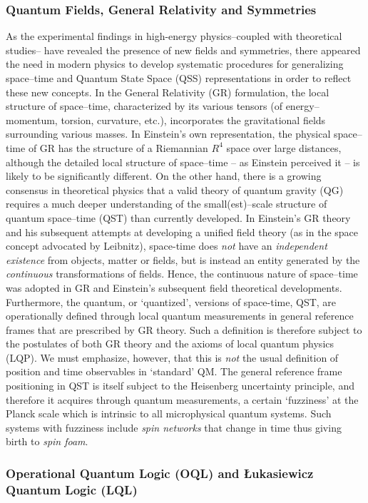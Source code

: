 \documentclass[12pt]{article}
\theoremstyle{plain}
\theoremstyle{definition}
\theoremstyle{plain}
\numberwithin{equation}{section}
\begin{document}
\subsubsection{Quantum Fields, General Relativity and Symmetries}
 As the experimental findings in high-energy physics--coupled
with theoretical studies-- have revealed the presence of new fields
and symmetries, there appeared the need in modern physics to develop
systematic procedures for generalizing space--time and Quantum State
Space (QSS) representations in order to reflect these new
concepts. In the General Relativity (GR) formulation, the local structure of
space--time, characterized by its various tensors (of
energy--momentum, torsion, curvature, etc.), incorporates the
gravitational fields surrounding various masses. In Einstein's own
representation, the physical space--time of GR has the structure
of a Riemannian $R^4$ space over large distances, although the
detailed local structure of space--time -- as Einstein perceived
it -- is likely to be significantly different. On the other hand, 
there is a growing consensus in theoretical physics that a valid 
theory of quantum gravity (QG) requires a much
deeper understanding of the small(est)--scale structure of quantum
space--time (QST) than currently developed. In Einstein's GR
theory and his subsequent attempts at developing a unified field
theory (as in the space concept advocated by Leibnitz), space-time
does \emph{not} have an \emph{independent existence} from objects,
matter or fields, but is instead an entity generated by the
\emph{continuous} transformations of fields. Hence, the continuous
nature of space--time was adopted in GR and Einstein's subsequent
field theoretical developments. Furthermore, the quantum, or
`quantized', versions of space-time, QST, are operationally
defined through local quantum measurements in general reference
frames that are prescribed by GR theory. Such a definition is
therefore subject to the postulates of both GR theory and the
axioms of local quantum physics (LQP). We must emphasize, however, that
this is \emph{not} the usual definition of position and time
observables in `standard' QM. The general reference
frame positioning in QST is itself subject to the Heisenberg
uncertainty principle, and therefore it acquires through quantum
measurements, a certain `fuzziness' at the Planck scale which is
intrinsic to all microphysical quantum systems. Such systems with
fuzziness include \emph{spin networks} that change in time thus giving birth
to \emph{spin foam}. 

\subsubsection{Operational Quantum Logic (OQL) and \L{}ukasiewicz Quantum Logic (LQL)}
 
\end{document}
